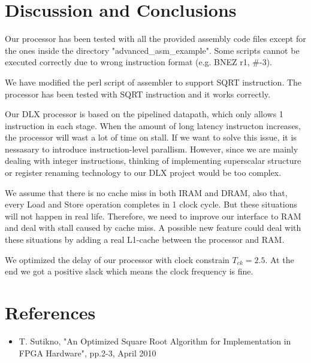 \chapter[Discussion and Conclusions]{Discussion and Conclusions}
Our processor has been tested with all the provided assembly code files except for
the ones inside the directory "advanced\_asm\_example". Some scripts cannot be executed
correctly due to wrong instruction format (e.g. BNEZ r1, \#-3).

We have modified the perl script of assembler to support SQRT instruction. The processor
has been tested with SQRT instruction and it works correctly.

Our DLX processor is based on the pipelined datapath, which only allows 1 instruction
in each stage. When the amount of long latency instructon increases, the processor
will wast a lot of time on stall. If we want to solve this issue, it is nessasary
to introduce instruction-level parallism.
However, since we are mainly dealing with integer instructions, thinking of implementing superscalar
structure or register renaming technology to our DLX project would be too complex.

We assume that there is no cache miss in both IRAM and DRAM, also that, every Load and
Store operation completes in 1 clock cycle. But these situations will not happen
in real life. Therefore, we need to improve our interface to RAM and deal with stall caused by
cache miss. A possible new feature could deal with these situations by adding a real L1-cache between
the processor and RAM.

We optimized the delay of our processor with clock constrain $T_{ck}=2.5$. At the end
we got a positive slack which means the clock frequency is fine.

\chapter[References]{References}
\begin{itemize}
	\item T. Sutikno, "An Optimized Square Root Algorithm for Implementation in FPGA Hardware", pp.2-3, April 2010
\end{itemize}

